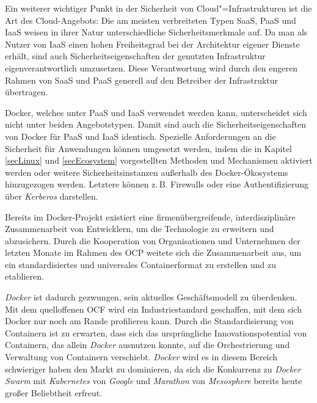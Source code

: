 \documentclass[../main.tex]{subfiles}
\begin{document}
  Ein weiterer wichtiger Punkt in der Sicherheit von Cloud"=Infrastrukturen ist die Art des Cloud-Angebots: Die am meisten verbreiteten Typen SaaS, PaaS und IaaS weisen in ihrer Natur unterschiedliche Sicherheitsmerkmale auf. Da man als Nutzer von IaaS einen hohen Freiheitsgrad bei der Architektur eigener Dienste erhält, sind auch Sicherheitseigenschaften der genutzten Infrastruktur eigenverantwortlich umzusetzen. Diese Verantwortung wird durch den engeren Rahmen von SaaS und PaaS generell auf den Betreiber der Infrastruktur übertragen.

  Docker, welches unter PaaS und IaaS verwendet werden kann, unterscheidet sich nicht unter beiden Angebotstypen. Damit sind auch die Sicherheitseigenschaften von Docker für PaaS und IaaS identisch. Spezielle Anforderungen an die Sicherheit für Anwendungen können umgesetzt werden, indem die in Kapitel \ref{secLinux} und \ref{secEcosystem} vorgestellten Methoden und Mechanismen aktiviert werden oder weitere Sicherheitsinstanzen außerhalb des Docker-Ökosystems hinzugezogen werden. Letztere können z.\,B. Firewalls oder eine Authentifizierung über \emph{Kerberos} darstellen.





  Bereits im Docker-Projekt existiert eine firmenübergreifende, interdisziplinäre Zusammenarbeit von Entwicklern, um die Technologie zu erweitern und abzusichern. Durch die Kooperation von Organisationen und Unternehmen der letzten Monate im Rahmen des \acrshort{OCP} weitete sich die Zusammenarbeit aus, um ein standardisiertes und universales Containerformat zu erstellen und zu etablieren.

  \emph{Docker} ist dadurch gezwungen, sein aktuelles Geschäftsmodell zu überdenken. Mit dem quelloffenen OCF wird ein Industriestandard geschaffen, mit dem sich Docker nur noch am Rande profilieren kann. Durch die Standardisierung von Containern ist zu erwarten, dass sich das ursprüngliche Innovationspotential von Containern, das allein \emph{Docker} ausnutzen konnte, auf die Orchestrierung und Verwaltung von Containern verschiebt. \emph{Docker} wird es in diesem Bereich schwieriger haben den Markt zu dominieren, da sich die Konkurrenz zu \emph{Docker Swarm} mit \emph{Kubernetes} von \emph{Google} und \emph{Marathon} von \emph{Mesosphere} bereits heute großer Beliebtheit erfreut.
\end{document}
